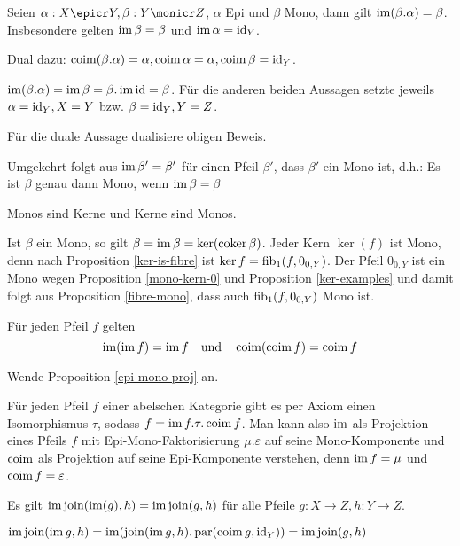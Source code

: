 \begin{korr}
Seien $\alpha : X \epicr Y, \beta : Y \monicr Z$, $\alpha$ Epi und $\beta$ Mono, dann gilt $\operatorname{im}(\beta.\alpha) = \beta$. Insbesondere gelten $\operatorname{im} \beta = \beta$ und $\operatorname{im} \alpha = \operatorname{id}_Y$.

Dual dazu: $\operatorname{coim}(\beta.\alpha) = \alpha, \operatorname{coim} \alpha = \alpha, \operatorname{coim} \beta = \operatorname{id}_Y$.
\end{korr}
\begin{bew}
$\operatorname{im}(\beta.\alpha) = \operatorname{im} \beta = \beta.\operatorname{im} \operatorname{id} = \beta$. Für die anderen beiden Aussagen setzte jeweils $\alpha = \operatorname{id}_Y, X=Y$ bzw. $\beta = \operatorname{id}_Y, Y=Z$.

Für die duale Aussage dualisiere obigen Beweis.
\end{bew}
\begin{bem}
Umgekehrt folgt aus $\operatorname{im}\beta' = \beta'$ für einen Pfeil $\beta'$, dass $\beta'$ ein Mono ist, d.h.:
Es ist $\beta$ genau dann Mono, wenn $\operatorname{im}\beta = \beta$
\end{bem}

\begin{korr}
Monos sind Kerne und Kerne sind Monos.
\end{korr}
\begin{bew}
Ist $\beta$ ein Mono, so gilt $\beta = \operatorname{im}\beta = \ker(\operatorname{coker}\beta)$.
Jeder Kern $\ker(f)$ ist Mono, denn nach Proposition \ref{ker-is-fibre} ist $\ker f = \operatorname{fib}_1(f,0_{0,Y})$.
Der Pfeil $0_{0,Y}$ ist ein Mono wegen Proposition \ref{mono-kern-0} und Proposition \ref{ker-examples} und damit folgt aus Proposition \ref{fibre-mono}, dass auch $\operatorname{fib}_1(f,0_{0,Y})$ Mono ist.
\end{bew}

\begin{korr}
Für jeden Pfeil $f$ gelten
\[ \operatorname{im}(\operatorname{im} f) = \operatorname{im} f \quad\text{und}\quad \operatorname{coim}(\operatorname{coim} f) = \operatorname{coim} f \]
\end{korr}
\begin{bew}
Wende Proposition \ref{epi-mono-proj} an.
\end{bew}

\begin{bem}
Für jeden Pfeil $f$ einer abelschen Kategorie gibt es per Axiom einen Isomorphismus $\tau$, sodass $f = \operatorname{im} f.\tau.\operatorname{coim} f$.
Man kann also $\operatorname{im}$ als Projektion eines Pfeils $f$ mit Epi-Mono-Faktorisierung $\mu.\varepsilon$ auf seine Mono-Komponente und $\operatorname{coim}$ als Projektion auf seine Epi-Komponente verstehen, denn $\operatorname{im} f = \mu$ und $\operatorname{coim} f = \varepsilon$.

\end{bem}

\begin{prop} \label{im-join-im-elim}
Es gilt $\operatorname{im}\operatorname{join}(\operatorname{im}(g),h) = \operatorname{im}\operatorname{join}(g,h)$ für alle Pfeile $g:X\to Z,h : Y\to Z$.
\end{prop}
\begin{bew}
$\operatorname{im}\operatorname{join}(\operatorname{im} g,h) = \operatorname{im}(\operatorname{join}(\operatorname{im} g,h).\operatorname{par}(\operatorname{coim} g,\operatorname{id}_Y)) = \operatorname{im}\operatorname{join}(g,h)$
\end{bew}
